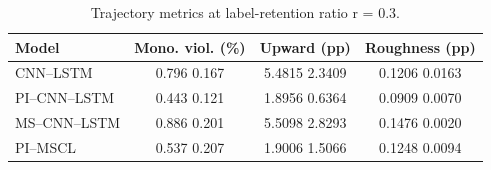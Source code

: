 \begin{table}[htbp]
\caption{Trajectory metrics at label-retention ratio r = 0.3.}
\label{tab:trajectory_metrics_sparse}
\centering
\setlength{\tabcolsep}{3.5pt}
\begin{tabular}{lccc}
\toprule
Model & Mono. viol. (\%) & Upward (pp) & Roughness (pp) \\
\midrule
CNN--LSTM & 0.796 \textpm{} 0.167 & 5.4815 \textpm{} 2.3409 & 0.1206 \textpm{} 0.0163 \\
PI--CNN--LSTM & 0.443 \textpm{} 0.121 & 1.8956 \textpm{} 0.6364 & 0.0909 \textpm{} 0.0070 \\
MS--CNN--LSTM & 0.886 \textpm{} 0.201 & 5.5098 \textpm{} 2.8293 & 0.1476 \textpm{} 0.0020 \\
PI--MSCL & 0.537 \textpm{} 0.207 & 1.9006 \textpm{} 1.5066 & 0.1248 \textpm{} 0.0094 \\
\bottomrule
\end{tabular}
\end{table}
